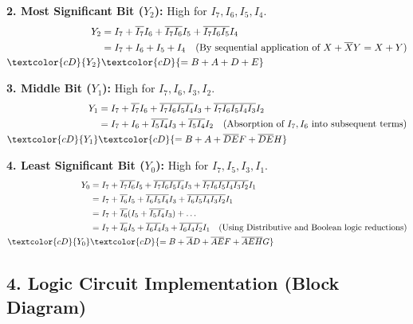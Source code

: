 \documentclass[12pt,a3paper]{article}
\begin{document}
\begin{enumerate}
\begin{tcolorbox}[enhanced,breakable,ansbox,colback=cD!4,colframe=cD,boxrule=0.8pt,arc=5pt,title={\textbf{Answer}},fonttitle=\bfseries\color{white},colbacktitle=cD]
\textbf{2. Most Significant Bit ($Y_2$):} High for $I_7, I_6, I_5, I_4$.
\begin{align*}
    Y_2 &= I_7 + \overline{I_7}I_6 + \overline{I_7}\overline{I_6}I_5 + \overline{I_7}\overline{I_6}\overline{I_5}I_4 \\
    &= I_7 + I_6 + I_5 + I_4 \quad \text{(By sequential application of } X + \overline{X}Y = X + Y \text{)} \\
    \textcolor{cD}{Y_2} &\textcolor{cD}{= B + A + D + E}
\end{align*}

\textbf{3. Middle Bit ($Y_1$):} High for $I_7, I_6, I_3, I_2$.
\begin{align*}
    Y_1 &= I_7 + \overline{I_7}I_6 + \overline{I_7}\overline{I_6}\overline{I_5}\overline{I_4}I_3 + \overline{I_7}\overline{I_6}\overline{I_5}\overline{I_4}\overline{I_3}I_2 \\
    &= I_7 + I_6 + \overline{I_5}\overline{I_4}I_3 + \overline{I_5}\overline{I_4}I_2 \quad \text{(Absorption of } I_7, I_6 \text{ into subsequent terms)} \\
    \textcolor{cD}{Y_1} &\textcolor{cD}{= B + A + \overline{D}\overline{E}F + \overline{D}\overline{E}H}
\end{align*}

\textbf{4. Least Significant Bit ($Y_0$):} High for $I_7, I_5, I_3, I_1$.
\begin{align*}
    Y_0 &= I_7 + \overline{I_7}\overline{I_6}I_5 + \overline{I_7}\overline{I_6}\overline{I_5}\overline{I_4}I_3 + \overline{I_7}\overline{I_6}\overline{I_5}\overline{I_4}\overline{I_3}\overline{I_2}I_1 \\
    &= I_7 + \overline{I_6}I_5 + \overline{I_6}\overline{I_5}\overline{I_4}I_3 + \overline{I_6}\overline{I_5}\overline{I_4}\overline{I_3}\overline{I_2}I_1 \\
    &= I_7 + \overline{I_6}(I_5 + \overline{I_5}\overline{I_4}I_3) + \dots \\
    &= I_7 + \overline{I_6}I_5 + \overline{I_6}\overline{I_4}I_3 + \overline{I_6}\overline{I_4}\overline{I_2}I_1 \quad \text{(Using Distributive and Boolean logic reductions)} \\
    \textcolor{cD}{Y_0} &\textcolor{cD}{= B + \overline{A}D + \overline{A}\overline{E}F + \overline{A}\overline{E}\overline{H}G}
\end{align*}

\subsection*{4. Logic Circuit Implementation (Block Diagram)}


\end{tcolorbox}
\end{enumerate}
\end{document}
